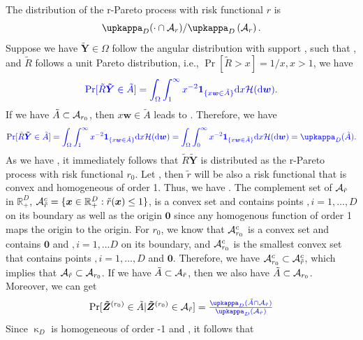 \documentclass[12pt]{article}
\begin{document}
    The distribution of the r-Pareto process with risk functional $r$ is 
    $$\upkappa_D(\cdot\cap \calA_r )/\upkappa_D\left(\calA_r\right).$$ 
    Suppose we have $\bm{\tilde Y}\in\Omega$ follow the angular distribution \PZ{$\calH$} with support , such that  ,  and $\tilde R$ follows a unit Pareto distribution, i.e., $\Pr[\tilde R>x]=1/x, x>1$, we have
    $$\textcolor{blue}{{\rm Pr}[\tilde R\bm{\tilde Y}\in \tilde A] = \int_{\Omega}\int_{1}^{\infty} x^{-2}\bm 1_{\{x\bm w\in \tilde A\}}\text dx{\mathcal H}(\text d\bm w).}$$
    If we have $\tilde A\subset{\mathcal A}_{r_0}$, then $x\bm w\in\tilde A$ leads to . Therefore, we have 
    $$\PZ{\Pr[\tilde R\bm{\tilde Y}\in \tilde A] = \int_{\Omega}\int_{1}^{\infty} x^{-2}\bm 1_{\{x\bm w\in \tilde A\}}\text dx\calH(\text d\bm w) = \int_{\Omega}\int_{0}^{\infty} x^{-2}\bm 1_{\{x\bm w\in \tilde A\}}\text dx\calH(\text d\bm w) = \upkappa_D(\tilde A).}$$ 
    As we have , it immediately follows that $\tilde R\bm {\tilde Y}$ is distributed as the r-Pareto process with risk functional $r_0$. Let , then $\tilde r$ will be also a risk functional that is convex and homogeneous of order 1. Thus, we have . The complement set of ${\mathcal A}_{\tilde r}$ in $\mathbb R_+^D$, ${\mathcal A}_{\tilde r}^c=\{\bm x\in\mathbb R_+^D: \tilde r(\bm x)\leq 1\}$, is a convex set and contains points $, i=1,\dots,D$ on its boundary as well as the origin $\bm 0$ since any homogenous function of order 1 maps the origin to the origin. For $r_0$, we know that ${\mathcal A}_{r_0}^c$ is a convex set and contains $\bm 0$ and $,i=1,\dots D$ on its boundary, and ${\mathcal A}_{r_0}^c$ is the smallest convex set that contains points $,i=1,\dots,D$ and $\bm 0$. Therefore, we have ${\mathcal A}_{r_0}^c\subset {\mathcal A}_{\tilde r}^c$, which implies that ${\mathcal A}_{\tilde r} \subset {\mathcal A}_{r_0}$. If we have $\tilde A\subset{\mathcal A}_{\tilde r}$, then we also have  $\tilde A\subset{\mathcal A}_{r_0}$. Moreover, we can get
    \begin{equation}
        \Pr[\bm{\tilde Z}^{(r_0)}\in \tilde A | \bm{\tilde Z}^{(r_0)} \in \calA_{\tilde r} ] = \PZ{\frac{\upkappa_D(\tilde A\cap \calA_{\tilde r})}{\upkappa_D(\calA_{\tilde r})}} 
    \end{equation}
    Since $\upkappa_D$ is homogeneous of order -1 and , it follows that
\end{document}
